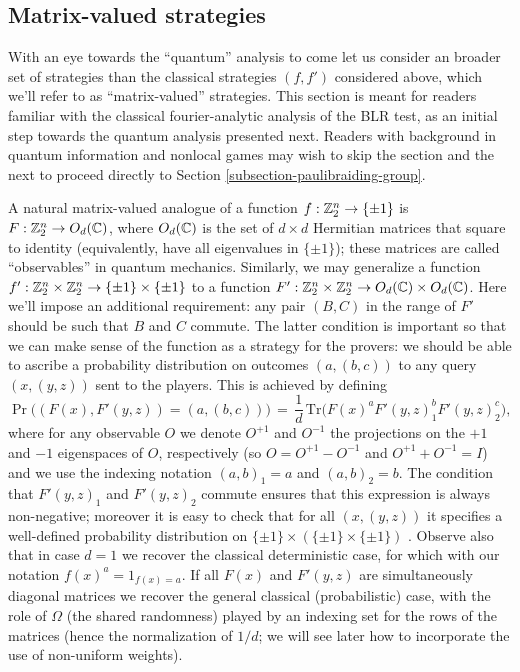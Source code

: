 \subsection{Matrix-valued strategies}
\label{subsection-matrix-val-strat}

With an eye towards the ``quantum'' analysis to come let us consider an broader set of strategies than the classical strategies $(f,f')$ considered above, which we'll refer to as ``matrix-valued'' strategies. This section is meant for readers familiar with the classical fourier-analytic analysis of the BLR test, as an initial step towards the quantum analysis presented next. Readers with background in quantum information and nonlocal games may wish to skip the section and the next to proceed directly to Section \ref{subsection-paulibraiding-group}. 

A natural matrix-valued analogue of a function $f:\mathbb{Z}_2^n \to \{\pm 1\}$ is $F:\mathbb{Z}_2^n \to O_d(\mathbb{C})$, where $O_d(\mathbb{C})$ is the set of $d\times d$ Hermitian matrices that square to identity (equivalently, have all eigenvalues in $\{\pm 1\}$); these matrices are called ``observables'' in quantum mechanics. Similarly, we may generalize a function  $f':\mathbb{Z}_2^n \times \mathbb{Z}_2^n \to \{\pm 1 \} \times \{\pm 1\}$ to a function  $F':\mathbb{Z}_2^n \times \mathbb{Z}_2^n \to O_d(\mathbb{C}) \times O_d(\mathbb{C})$. Here we'll impose an additional requirement: any pair $(B,C)$ in the range of $F'$ should be such that $B$ and $C$ commute. The latter condition is important so that we can make sense of the function as a strategy for the provers: we should be able to ascribe a probability distribution on outcomes $(a,(b,c))$ to any query $(x,(y,z))$ sent to the players. This is achieved by defining 
\begin{equation}\label{eq:matrixprob}
\Pr\big((F(x), F'(y,z))=(a,(b,c))\big)\,=\,\frac{1}{d}\,\mathrm{Tr}\big( F(x)^aF'(y,z)_1^b F'(y,z)_2^c\big),
\end{equation}
where for any observable $O$ we denote $O^{+1}$ and $O^{-1}$ the projections on the $+1$ and $-1$ eigenspaces of $O$, respectively (so $O=O^{+1}-O^{-1}$ and $O^{+1}+O^{-1}=I$) and we use the indexing notation $(a,b)_1=a$ and $(a,b)_2=b$. The condition that $F'(y,z)_1$ and $F'(y,z)_2$ commute ensures that this expression is always non-negative; moreover it is easy to check that for all $(x,(y,z))$ it specifies a well-defined probability distribution on $\{\pm 1\}\times (\{\pm1\}\times \{\pm1\})$ . Observe also that in case $d=1$ we recover the classical deterministic case, for which with our notation $f(x)^a = 1_{f(x)=a}$. If all $F(x)$ and $F'(y,z)$ are simultaneously diagonal matrices we recover the general classical (probabilistic) case, with the role of $\Omega$ (the shared randomness) played by an indexing set for the rows of the matrices (hence the normalization of $1/d$; we will see later how to incorporate the use of non-uniform weights). 

